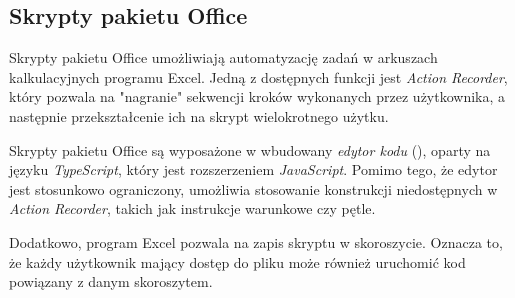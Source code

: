 \subsection{Skrypty pakietu Office}
Skrypty pakietu Office umożliwiają automatyzację zadań w arkuszach kalkulacyjnych programu Excel. Jedną z dostępnych funkcji jest \emph{Action Recorder}, który pozwala na "nagranie" sekwencji kroków wykonanych przez użytkownika, a następnie przekształcenie ich na skrypt wielokrotnego użytku.\par
Skrypty pakietu Office są wyposażone w wbudowany \emph{edytor kodu} (), oparty na języku \emph{TypeScript}, który jest rozszerzeniem \emph{JavaScript}. Pomimo tego, że edytor jest stosunkowo ograniczony, umożliwia stosowanie konstrukcji niedostępnych w \emph{Action Recorder}, takich jak instrukcje warunkowe czy pętle.\par
Dodatkowo, program Excel pozwala na zapis skryptu w skoroszycie. Oznacza to, że każdy użytkownik mający dostęp do pliku może również uruchomić kod powiązany z danym skoroszytem.